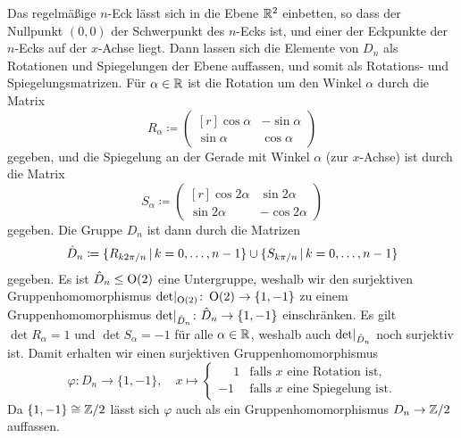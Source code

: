 Das regelmäßige $n$-Eck lässt sich in die Ebene $\mathbb{R}^2$ einbetten, so dass der Nullpunkt $(0,0)$ der Schwerpunkt des $n$-Ecks ist, und einer der Eckpunkte der $n$-Ecks auf der $x$-Achse liegt.
Dann lassen sich die Elemente von $D_n$ als Rotationen und Spiegelungen der Ebene auffassen, und somit als Rotations- und Spiegelungsmatrizen.
Für $\alpha \in \mathbb{R}$ ist die Rotation um den Winkel $\alpha$ durch die Matrix
\[
            R_\alpha
  \coloneqq \begin{pmatrix*}[r]
              \cos \alpha & -\sin \alpha  \\
              \sin \alpha &  \cos \alpha
            \end{pmatrix*}
\]
gegeben, und die Spiegelung an der Gerade mit Winkel $\alpha$ (zur $x$-Achse) ist durch die Matrix
\[
            S_\alpha
  \coloneqq \begin{pmatrix*}[r]
              \cos 2\alpha  &  \sin 2\alpha \\
              \sin 2\alpha  & -\cos 2\alpha
            \end{pmatrix*}
\]
gegeben.
Die Gruppe $D_n$ ist dann durch die Matrizen
\[
            \hat{D}_n
  \coloneqq \{
              R_{k 2\pi/n}
            \suchthat
              k = 0, \dotsc, n-1
            \}
            \cup
            \{
              S_{k \pi/n}
            \suchthat
              k = 0, \dotsc, n-1
            \}
\]
gegeben.
Es ist $\hat{D}_n \leq \operatorname{O}(2)$ eine Untergruppe, weshalb wir den surjektiven Gruppenhomomorphismus $\restrict{\det}{\orthogonal{2}} \colon \orthogonal{2} \to \{1, -1\}$ zu einem Gruppenhomomorphismus $\restrict{\det}{\hat{D}_n} \colon \hat{D}_n \to \{1,-1\}$ einschränken.
Es gilt $\det R_\alpha = 1$ und $\det S_\alpha = -1$ für alle $\alpha \in \mathbb{R}$, weshalb auch $\restrict{\det}{\hat{D}_n}$ noch surjektiv ist.
Damit erhalten wir einen surjektiven Gruppenhomomorphismus
\[
          \varphi
  \colon  D_n
  \to     \{1, -1\},
  \quad   x
  \mapsto \begin{cases}
            \phantom{-}1  & \text{falls $x$ eine Rotation ist}, \\
                      -1  & \text{falls $x$ eine Spiegelung ist}.
          \end{cases}
\]
Da $\{1, -1\} \cong \mathbb{Z}/2$ lässt sich $\varphi$ auch als ein Gruppenhomomorphismus $D_n \to \mathbb{Z}/2$ auffassen.





\addtocounter{subsection}{1}





\addtocounter{subsection}{1}
